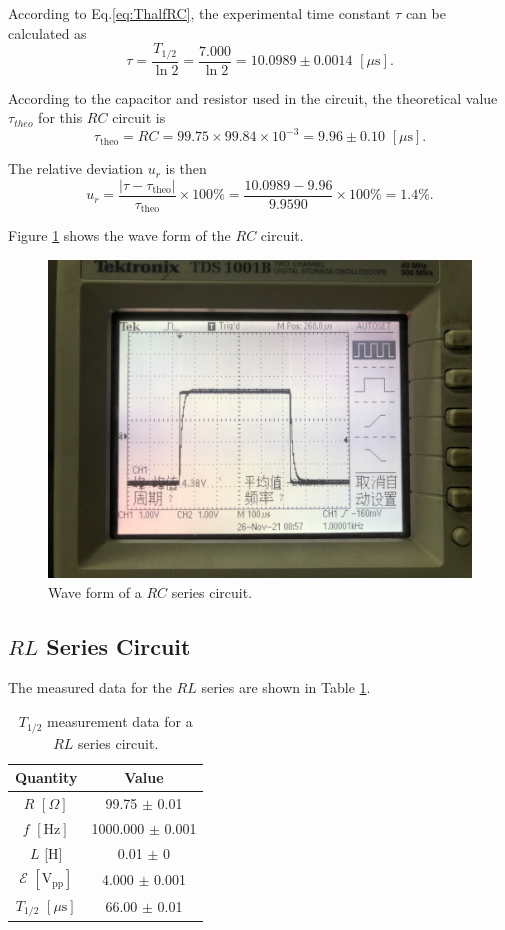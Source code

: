 \documentclass{article}
\begin{document}
According to Eq.\eqref{eq:ThalfRC}, the experimental time constant $\tau$ can be calculated as
$$\tau = \frac{T_{1/2}}{\ln 2} = \frac{7.000}{\ln 2} = 10.0989\pm 0.0014 \,\,[\mu\text{s}].$$

According to the capacitor and resistor used in the circuit, the theoretical value $\tau_{theo}$ for this $RC$ circuit is
$$\tau_{\text{theo}} = RC = 99.75 \times 99.84 \times 10^{-3} = 9.96 \pm 0.10 \,\,[\mu\text{s}].$$

The relative deviation $u_r$ is then
$$u_r = \frac{|\tau-\tau_{\text{theo}}|}{\tau_{\text{theo}}} \times 100\% = \frac{10.0989-9.96}{9.9590} \times 100\% = 1.4\%.$$

Figure \ref{RCwave} shows the wave form of the $RC$ circuit.

\begin{figure}[H]
\centering
\includegraphics[scale=0.075]{RCwave.jpeg}
\caption{Wave form of a $RC$ series circuit.}\label{RCwave}
\end{figure}

\subsection{$RL$ Series Circuit}

The measured data for the $RL$ series are shown in Table \ref{TableRL}.

\begin{table}[H]
    \centering
    \begin{tabular}{c|c}
\toprule
        Quantity & Value \\
        \midrule
        $R\,\,[\Omega]$ & 99.75 $\pm$ 0.01 \\
        $f\,\,[\text{Hz}]$ & 1000.000 $\pm$ 0.001 \\
        $L$ [H] & 0.01 $\pm$ 0 \\
        $\mathcal{E}\,\,[\text{V}_{\text{pp}}]$ & 4.000 $\pm$ 0.001    \\
        $T_{1/2}\,\,[\mu\text{s}]$  & 66.00 $\pm$ 0.01  \\
        \bottomrule
    \end{tabular}
    \caption{$T_{1/2}$ measurement data for a $RL$ series circuit.\label{TableRL}}
\end{table}
\end{document}
